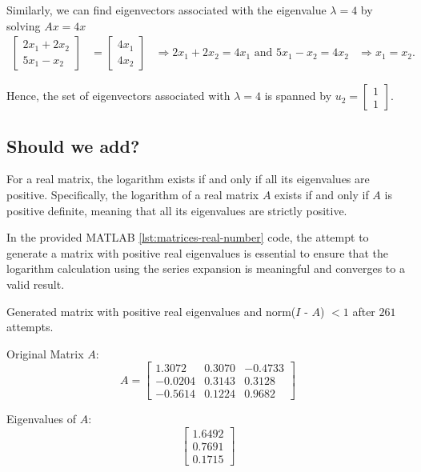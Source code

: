 \begin{example}
Similarly, we can find eigenvectors associated with the eigenvalue \( \lambda = 4 \) by solving \( Ax = 4x \)
\[
\begin{aligned}
    \begin{bmatrix} 2x_1 + 2x_2 \\ 5x_1 - x_2 \end{bmatrix} &= \begin{bmatrix} 4x_1 \\ 4x_2 \end{bmatrix} 
    &\Rightarrow 2x_1 + 2x_2 = 4x_1 \text{ and } 5x_1 - x_2 = 4x_2 
    &\Rightarrow x_1 = x_2.
\end{aligned}
\]

Hence, the set of eigenvectors associated with \( \lambda = 4 \) is spanned by \( u_2 = \begin{bmatrix} 1 \\ 1 \end{bmatrix} \).
\end{example}
\subsection{Should we add?}
For a real matrix, the logarithm exists if and only if all its eigenvalues are positive. Specifically, the logarithm of a real matrix $A$ exists if and only if $A$ is positive definite, meaning that all its eigenvalues are strictly positive.\newline

In the provided MATLAB \ref{lst:matrices-real-number} code, the attempt to generate a matrix with positive real eigenvalues is essential to ensure that the logarithm calculation using the series expansion is meaningful and converges to a valid result.

Generated matrix with positive real eigenvalues and norm($I$ - $A$) $< 1$ after $261$ attempts.

Original Matrix $A$:
\[ A =
    \begin{bmatrix}
        1.3072 & 0.3070 & -0.4733 \\
        -0.0204 & 0.3143 & 0.3128 \\
        -0.5614 & 0.1224 & 0.9682
    \end{bmatrix}
\]

Eigenvalues of $A$:
\[
    \begin{bmatrix}
        1.6492 \\
        0.7691 \\
        0.1715
    \end{bmatrix}
\]

